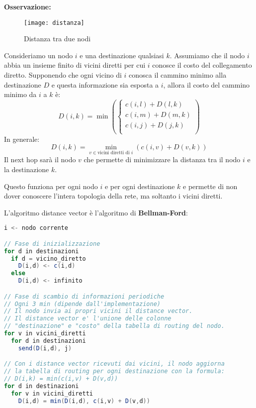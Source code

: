 \documentclass[a4paper]{article}
\begin{document}
\begin{itemize}
    \vspace{1em}
    \noindent
    \textbf{Osservazione:}
    \begin{figure}[H]
      \centering
      \texttt{[image: distanza]}
      \caption{Distanza tra due nodi}
    \end{figure}
    \noindent
    Consideriamo un nodo \( i \) e una destinazione qualsiasi \( k \). Assumiamo che il
    nodo \( i \) abbia un insieme finito di vicini diretti per cui \( i \) conosce il 
    costo del collegamento diretto. Supponendo che ogni vicino di \( i \) conosca il 
    cammino minimo alla destinazione \( D \) e questa informazione sia esposta a \( i \),
    allora il costo del cammino minimo da \( i \) a \( k \) è:
    \[
      D(i,k) = \min \left( 
        \begin{cases}
          c(i,l) + D(l,k)\\
          c(i,m) + D(m,k)\\
          c(i,j) + D(j,k)\\
        \end{cases}
      \right) 
    \] 
    In generale:
    \[
      D(i,k) = \min_{v \in \text{vicini diretti di }i}\left( c(i,v) + D(v,k) \right) 
    \] 
    Il next hop sarà il nodo \( v \) che permette di minimizzare la distanza tra il nodo
    \( i \) e la destinazione \( k \).

    Questo funziona per ogni nodo \( i \) e per ogni destinazione \( k \) e permette
    di non dover conoscere l'intera topologia della rete, ma soltanto i vicini diretti.

    \vspace{1em}
    \noindent
    L'algoritmo distance vector è l'algoritmo di \textbf{Bellman-Ford}:
\begin{lstlisting}[language=Scala]
i <- nodo corrente

// Fase di inizializzazione
for d in destinazioni
  if d = vicino_diretto
    D(i,d) <- c(i,d)
  else
    D(i,d) <- infinito

// Fase di scambio di informazioni periodiche
// Ogni 3 min (dipende dall'implementazione)
// Il nodo invia ai propri vicini il distance vector.
// Il distance vector e' l'unione delle colonne 
// "destinazione" e "costo" della tabella di routing del nodo.
for v in vicini_diretti
  for d in destinazioni
    send(D(i,d), j)

// Con i distance vector ricevuti dai vicini, il nodo aggiorna
// la tabella di routing per ogni destinazione con la formula:
// D(i,k) = min(c(i,v) + D(v,d))
for d in destinazioni
  for v in vicini_diretti
    D(i,d) = min(D(i,d), c(i,v) + D(v,d))
\end{lstlisting}


\end{itemize}
\end{document}
